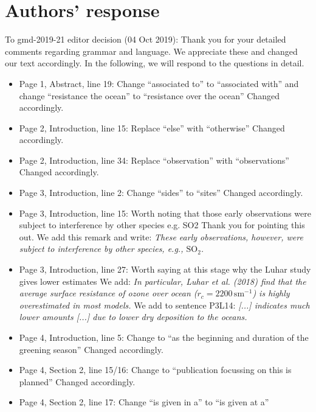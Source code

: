 
%
\section*{Authors' response}
To gmd-2019-21 editor decision (04 Oct 2019):
Thank you for your detailed comments regarding grammar and language.
We appreciate these and changed our text accordingly.
In the following, we will respond to the questions in detail.
\begin{itemize}

\item {\color{blue} Page 1, Abstract, line 19: Change “associated to” to “associated with” and change “resistance the ocean” to “resistance over the ocean”}
  Changed accordingly.
\item {\color{blue} Page 2, Introduction, line 15: Replace “else” with “otherwise”}
  Changed accordingly.
\item {\color{blue} Page 2, Introduction, line 34: Replace “observation” with “observations”}
  Changed accordingly.
\item {\color{blue} Page 3, Introduction, line 2: Change “sides” to “sites”}
  Changed accordingly.
\item {\color{blue}Page 3, Introduction, line 15: Worth noting that those early observations were subject to interference by other species e.g. SO2}
  Thank you for pointing this out. We add this remark and write: \emph{These early observations, however, were subject to interference by other species, e.g., $\mathrm{SO_2}$.}
\item {\color{blue}Page 3, Introduction, line 27: Worth saying at this stage why the Luhar study gives lower estimates}
  We add: \emph{In particular, Luhar et al. (2018) find that the average surface resistance of ozone over ocean ($r_c=2200\,\mathrm{sm^{-1}}$) is highly overestimated in most models.}
  We add to sentence P3L14: \emph{[...] indicates much lower amounts [...] due to lower dry deposition to the oceans.}
\item {\color{blue}Page 4, Introduction, line 5: Change to “as the beginning and duration of the greening season”}
  Changed accordingly.
\item {\color{blue}Page 4, Section 2, line 15/16: Change to “publication focussing on this is planned”}
  Changed accordingly.
\item {\color{blue}Page 4, Section 2, line 17: Change “is given in a” to “is given at a”}

\end{itemize}

